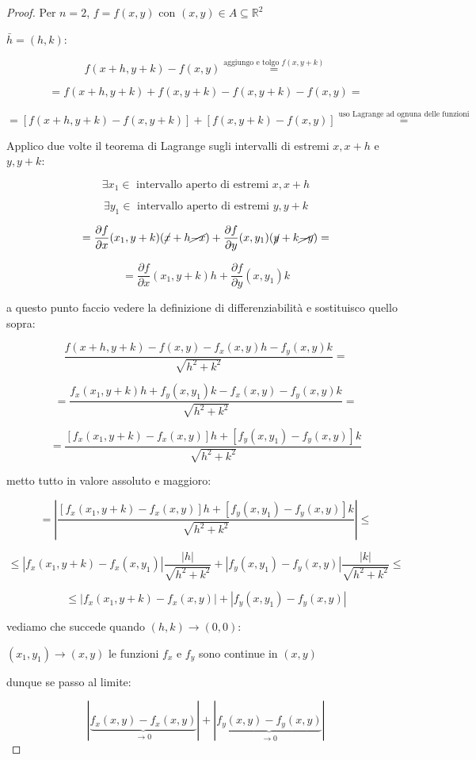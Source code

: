 \documentclass[11pt]{article}
\begin{document}
\begin{proof}
       Per $n=2$, $f = f(x,y)$ con $(x,y) \in A \subseteq \mathbb{R}^{2}$ 

       $\bar{h} = (h,k)$:

       \[
           f(x+h,y+k) - f(x,y) \overset{\text{aggiungo e tolgo $f(x,y+k)$}}{=} 
       \]

       \[
           = f(x+h,y+k) + f(x,y+k) - f(x,y+k) - f(x,y) = 
       \]

       \[
           = [f(x+h,y+k) - f(x,y+k) ] + [f(x,y+k) - f(x,y)] \overset{\text{uso Lagrange ad ognuna delle funzioni}}{=}
       \]

       Applico due volte il teorema di Lagrange sugli intervalli di estremi $x,x+h$ e $y,y+k$:

       \[
           \exists x_1 \in  \text{ intervallo aperto di estremi } x,x+h
       \]

       \[
           \exists y_1 \in  \text{ intervallo aperto di estremi } y,y+k
       \]

       \[
           = \frac{\partial f}{\partial x}(x_1,y+k) (\cancel{x} +h \cancel{-x}) + \frac{\partial f}{\partial y}(x,y_1) ( \cancel{y} + k \cancel{-y}) = 
       \]

       \[
           =\frac{\partial f}{\partial x}(x_1,y+k) h + \frac{\partial f}{\partial y}(x,y_1)k 
       \]

       a questo punto faccio vedere la definizione di differenziabilità e sostituisco quello sopra:

       \[
           \frac{f(x+h,y+k) - f(x,y) - f_x(x,y)h - f_y(x,y) k}{\sqrt{h^{2}+k^{2}}} = 
       \]

       \[
           = \frac{f_x(x_1,y+k) h + f_y(x,y_1) k -f_x(x,y) - f_y(x,y) k}{\sqrt{h^{2}+k^{2}}} = 
       \]

       \[
           = \frac{[f_x(x_1,y+k) - f_x(x,y)] h + [f_y(x,y_1) - f_y(x,y)] k}{\sqrt{h^{2}+k^{2}}}
       \]

       metto tutto in valore assoluto e maggioro:

       \[
           = |\frac{[f_x(x_1,y+k) - f_x(x,y)] h + [f_y(x,y_1) - f_y(x,y)] k}{\sqrt{h^{2}+k^{2}}}| \le 
       \]

       \[
       \le |f_x(x_1,y+k) - f_x(x,y_1)| \frac{|h|}{\sqrt{h^{2}+k^{2}}} + | f_y(x,y_1) - f_y(x,y)| \frac{|k|}{\sqrt{h^{2}+k^{2}}} \le 
       \]

       \[
            \le  |f_x(x_1,y+k) - f_x(x,y) | + |f_y(x,y_1) - f_y(x,y) |
       \]

       vediamo che succede quando $(h,k) \rightarrow (0,0)$:

        $(x_1,y_1) \rightarrow (x,y)$ le funzioni $f_x$ e $f_y$ sono continue in $(x,y)$

        dunque se passo al limite:

        \[
            |\underbrace{f_x(x,y) - f_x(x,y)}_\text{$\rightarrow 0$} | + |\underbrace{f_y(x,y) - f_y(x,y)}_\text{$\rightarrow 0$} |
        \]

\end{proof}
\end{document}
